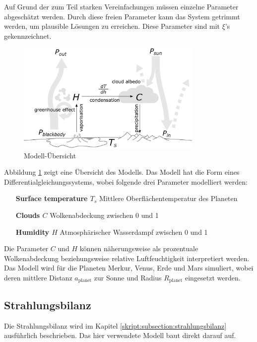 \begin{refsection}
Auf Grund der zum Teil starken Vereinfachungen müssen einzelne Parameter abgeschätzt werden. Durch diese freien Parameter kann das System getrimmt werden, um plausible Lösungen zu erreichen. Diese Parameter sind mit $\xi$'s gekennzeichnet.

\begin{figure}
	\centering
	\includegraphics[width=0.8\textwidth]{planeten/Pictures/Model.eps}
	\caption{Modell-Übersicht}
	\label{planeten:model}
\end{figure}
Abbildung \ref{planeten:model} zeigt eine Übersicht des Modells.
Das Modell hat die Form eines Differentialgleichungssystems, wobei folgende drei Parameter modelliert werden:
\begin{itemize}[labelindent=1cm,labelsep=0.5cm,rightmargin=*]
\item [\textbf{Surface temperature $T_s$}]	Mittlere Oberflächentemperatur des Planeten
\item [\textbf{Clouds $C$}]		Wolkenabdeckung zwischen 0 und 1
\item [\textbf{Humidity $H$}]		Atmosphärischer Wasserdampf zwischen 0 und 1
\end{itemize}
Die Parameter $C$ und $H$ können näherungsweise als prozentuale Wolkenabdeckung beziehungsweise relative Luftfeuchtigkeit  interpretiert werden.
Das Modell wird für die Planeten Merkur, Venus, Erde und Mars simuliert, wobei deren mittlere Distanz $a_\text{planet}$ zur Sonne und Radius $R_\text{planet}$ eingesetzt werden.

\subsection{Strahlungsbilanz}
Die Strahlungsbilanz wird im Kapitel \ref{skript:subsection:strahlungsbilanz} ausführlich beschrieben. Das hier verwendete Modell baut direkt darauf auf.


\end{refsection}
